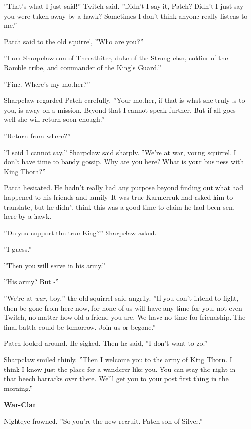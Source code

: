 \documentclass[11pt]{article}
\begin{document}
 ''That's what I just said!'' Twitch said. ''Didn't I say it, Patch? Didn't I just say you were taken away by a hawk? Sometimes I don't think anyone really listens to me.''\par
 Patch said to the old squirrel, ''Who are you?''\par
 ''I am Sharpclaw son of Throatbiter, duke of the Strong clan, soldier of the Ramble tribe, and commander of the King's Guard.''\par
 ''Fine. Where's my mother?''\par
 Sharpclaw regarded Patch carefully. ''Your mother, if that is what she truly is to you, is away on a mission. Beyond that I cannot speak further. But if all goes well she will return soon enough.''\par
 ''Return from where?''\par
 ''I said I cannot say,'' Sharpclaw said sharply. ''We're at war, young squirrel. I don't have time to bandy gossip. Why are you here? What is your business with King Thorn?''\par
 Patch hesitated. He hadn't really had any purpose beyond finding out what had happened to his friends and family. It was true Karmerruk had asked him to translate, but he didn't think this was a good time to claim he had been sent here by a hawk.\par
 ''Do you support the true King?'' Sharpclaw asked.\par
 ''I guess.''\par
 ''Then you will serve in his army.''\par
 ''His army? But -''\par
 ''We're at {\it war}, boy,'' the old squirrel said angrily. ''If you don't intend to fight, then be gone from here now, for none of us will have any time for you, not even Twitch, no matter how old a friend you are. We have no time for friendship. The final battle could be tomorrow. Join us or begone.''\par
 Patch looked around. He sighed. Then he said, ''I don't want to go.''\par
 Sharpclaw smiled thinly. ''Then I welcome you to the army of King Thorn. I think I know just the place for a wanderer like you. You can stay the night in that beech barracks over there. We'll get you to your post first thing in the morning.''\par
\par
{\bf War-Clan\par
}\par
 Nighteye frowned. ''So you're the new recruit. Patch son of Silver.''\par
\end{document}
